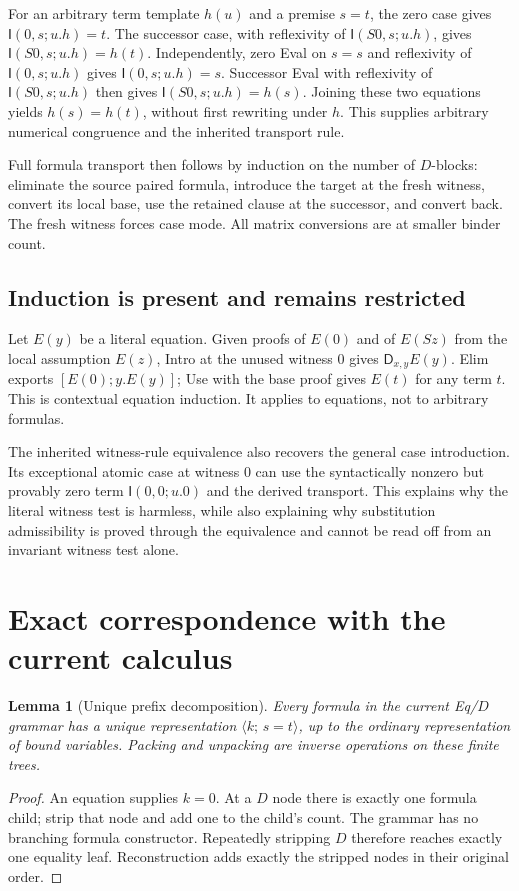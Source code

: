 \documentclass[11pt]{article}
\newtheorem{lemma}[theorem]{Lemma}
\theoremstyle{definition}\newtheorem{definition}[theorem]{Definition}
\theoremstyle{remark}\newtheorem{remark}[theorem]{Remark}
\newcommand{\I}{\mathsf I}
\newcommand{\D}{\mathsf D}
\newcommand{\Eq}[3]{\langle #1;\,#2=#3\rangle}
\begin{document}
For an arbitrary term template $h(u)$ and a premise $s=t$, the zero
case gives $\I(0,s;u.h)=t$. The successor case, with reflexivity of
$\I(S0,s;u.h)$, gives $\I(S0,s;u.h)=h(t)$. Independently, zero Eval
on $s=s$ and reflexivity of $\I(0,s;u.h)$ gives
$\I(0,s;u.h)=s$. Successor Eval with reflexivity of $\I(S0,s;u.h)$
then gives $\I(S0,s;u.h)=h(s)$. Joining these two equations yields
$h(s)=h(t)$, without first rewriting under $h$. This supplies arbitrary numerical congruence
and the inherited transport rule.

Full formula transport then follows by induction on the number of
$D$-blocks: eliminate the source paired formula, introduce the target at
the fresh witness, convert its local base, use the retained clause at the
successor, and convert back. The fresh witness forces case mode. All
matrix conversions are at smaller binder count.

\subsection{Induction is present and remains restricted}

Let $E(y)$ be a literal equation. Given proofs of $E(0)$ and of
$E(Sz)$ from the local assumption $E(z)$, Intro at the unused witness
$0$ gives $\D_{x,y}E(y)$. Elim exports $[E(0);y.E(y)]$; Use with the
base proof gives $E(t)$ for any term $t$. This is contextual equation
induction. It applies to equations, not to arbitrary formulas.

The inherited witness-rule equivalence also recovers the general case
introduction. Its exceptional atomic case at witness $0$ can use the
syntactically nonzero but provably zero term $\I(0,0;u.0)$ and the derived
transport. This explains why the literal witness test is harmless, while
also explaining why substitution admissibility is proved through the
equivalence and cannot be read off from an invariant witness test alone.

\section{Exact correspondence with the current calculus}
\label{sec:equivalence}

\begin{lemma}[Unique prefix decomposition]
Every formula in the current Eq/$D$ grammar has a unique representation
$\Eq{k}{s}{t}$, up to the ordinary representation of bound variables.
Packing and unpacking are inverse operations on these finite trees.
\end{lemma}
\begin{proof}
An equation supplies $k=0$. At a $D$ node there is exactly one formula
child; strip that node and add one to the child's count. The grammar has
no branching formula constructor. Repeatedly stripping $D$ therefore
reaches exactly one equality leaf. Reconstruction adds exactly the
stripped nodes in their original order.
\end{proof}
\end{document}
